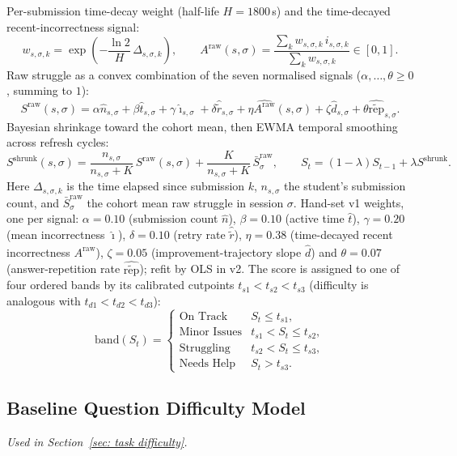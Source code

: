 Per-submission time-decay weight (half-life $H = 1800$\,s) and the time-decayed recent-incorrectness signal:
\[
    w_{s,\sigma,k} = \exp\!\left(-\frac{\ln 2}{H}\,\Delta_{s,\sigma,k}\right),
    \qquad
    A^{\mathrm{raw}}(s,\sigma)
    = \frac{\sum_{k} w_{s,\sigma,k}\, i_{s,\sigma,k}}{\sum_{k} w_{s,\sigma,k}} \in [0,1].
\]
Raw struggle as a convex combination of the seven normalised signals ($\alpha,\ldots,\theta \geq 0$, summing to $1$):
\[
    S^{\mathrm{raw}}(s,\sigma)
    = \alpha \hat{n}_{s,\sigma} + \beta  \hat{t}_{s,\sigma} + \gamma \hat{\imath}_{s,\sigma}
    + \delta \hat{\tilde{r}}_{s,\sigma} + \eta \widehat{A^{\mathrm{raw}}}(s,\sigma)
    + \zeta \hat{d}_{s,\sigma} + \theta \widehat{\tilde{\mathrm{rep}}}_{s,\sigma}.
\]
Bayesian shrinkage toward the cohort mean, then EWMA temporal smoothing across refresh cycles:
\[
    S^{\mathrm{shrunk}}(s,\sigma)
    = \frac{n_{s,\sigma}}{n_{s,\sigma} + K}\,S^{\mathrm{raw}}(s,\sigma)
    + \frac{K}{n_{s,\sigma} + K}\,\bar{S}^{\mathrm{raw}}_{\sigma},
    \qquad
    S_t = (1-\lambda)S_{t-1} + \lambda S^{\mathrm{shrunk}}.
\]
Here $\Delta_{s,\sigma,k}$ is the time elapsed since submission $k$, $n_{s,\sigma}$ the student's submission count, and $\bar{S}^{\mathrm{raw}}_\sigma$ the cohort mean raw struggle in session $\sigma$.
Hand-set v1 weights, one per signal: $\alpha=0.10$ (submission count $\hat{n}$), $\beta=0.10$ (active time $\hat{t}$), $\gamma=0.20$ (mean incorrectness $\hat{\imath}$), $\delta=0.10$ (retry rate $\hat{\tilde{r}}$), $\eta=0.38$ (time-decayed recent incorrectness $\widehat{A^{\mathrm{raw}}}$), $\zeta=0.05$ (improvement-trajectory slope $\hat{d}$) and $\theta=0.07$ (answer-repetition rate $\widehat{\tilde{\mathrm{rep}}}$); refit by OLS in v2. The score is assigned to one of four ordered bands by its calibrated cutpoints $t_{s1}<t_{s2}<t_{s3}$ (difficulty is analogous with $t_{d1}<t_{d2}<t_{d3}$):
\[
    \mathrm{band}(S_t) =
    \begin{cases}
        \text{On Track}     & S_t \le t_{s1},\\
        \text{Minor Issues} & t_{s1} < S_t \le t_{s2},\\
        \text{Struggling}   & t_{s2} < S_t \le t_{s3},\\
        \text{Needs Help}   & S_t > t_{s3}.
    \end{cases}
\]

\subsection{Baseline Question Difficulty Model}
\emph{Used in Section~\ref{sec: task difficulty}.}

